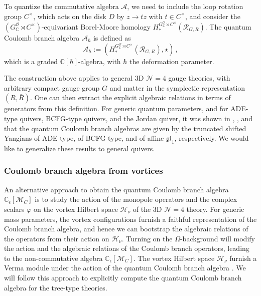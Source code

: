 \documentclass[12pt,a4paper]{article}
\renewcommand{\(}{\left(}
\renewcommand{\)}{\right)}
\newcommand{\eps}{\epsilon}
\renewcommand{\(}{\left(}
\renewcommand{\)}{\right)}
\begin{document}
To quantize the commutative algebra $\mathcal{A}$, we need to include the loop rotation group $C^{\times}$, 
which acts on the disk $D$ by 
$z\to tz$ with $t\in C^{\times}$,
and consider the $(G_{\mathbb{C}}^{\mathcal{O}}\rtimes C^{\times})$-equivariant Borel-Moore homology $H^{G_{\mathbb{C}}^{\mathcal{O}}\rtimes C^{\times}}_*(\mathcal{R}_{G,R})$. 
The quantum Coulomb branch algebra $\mathcal{A}_{\hbar}$ is defined as \cite{Braverman:2016wma}
\begin{equation}
\mathcal{A}_{\hbar}:=(H^{G_{\mathbb{C}}^{\mathcal{O}}\rtimes C^{\times}}_*(\mathcal{R}_{G,R}),\star)\,,
\end{equation}
which is a graded $\mathbb{C}[\hbar]$-algebra, with $\hbar$ the deformation parameter.

The construction above applies to general 3D $\mathcal{N}=4$ gauge theories, with arbitrary compact gauge group $G$ and matter in the symplectic representation $(R,\bar{R})$. 
One can then extract the explicit algebraic relations in terms of generators from this definition.
For generic quantum parameters, and for ADE-type quivers, BCFG-type quivers, and the Jordan quiver, it was shown in \cite{Braverman:2016pwk}, \cite{Kodera:2016faj_jordan_quiver}, and \cite{Nakajima:2019olw} that the quantum Coulomb branch algebras are given by the truncated shifted Yangians of ADE type, of BCFG type, and of affine $\mathfrak{gl}_1$, respectively.  
We would like to generalize these results to general quivers. 

\subsubsection{Coulomb branch algebra from vortices}\label{sssec:algebra_from_action}

An alternative approach \cite{Bullimore:2016hdc} to obtain the quantum Coulomb branch algebra $\mathbb{C}_\eps[\mathcal{M}_C]$ is to study the action of the monopole operators and the complex scalars $\varphi$ on the vortex Hilbert space $\mathcal{H}_\nu$ of the 3D $\mathcal{N}=4$ theory. 
For generic mass parameters, the vortex configurations furnish a faithful representation of the Coulomb branch algebra, and hence we can bootstrap the algebraic relations of the operators from their action on $\mathcal{H}_\nu$.
Turning on the $\Omega$-background will modify the action and the algebraic relations of the Coulomb branch operators, leading to the non-commutative algebra $\mathbb{C}_\eps[\mathcal{M}_C]$. 
The vortex Hilbert space $\mathcal{H}_\nu$ furnish a Verma module under the action of the quantum Coulomb branch algebra \cite{Braverman:2004vv,Braverman:2010ef,Bullimore:2016hdc}. 
We will follow this approach to explicitly compute the quantum Coulomb branch algebra for the tree-type theories.
\end{document}
